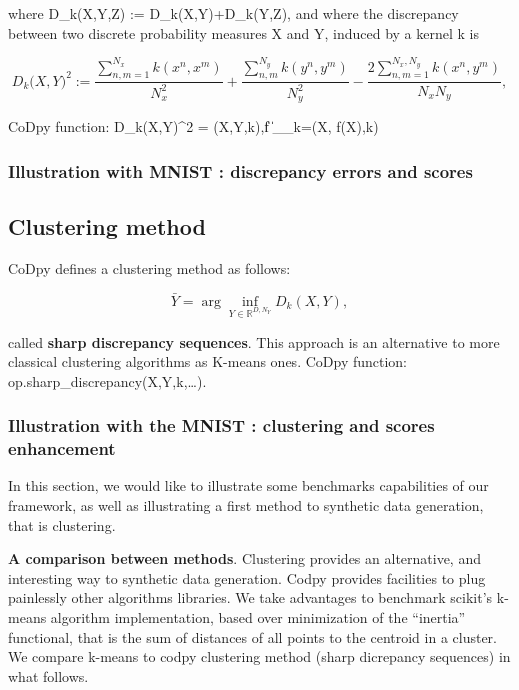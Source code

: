 \documentclass[]{article}
\def\({}%
\def\){}%
\numberwithin{equation}{section}
\newcommand \RR    {\mathbb{R}}
\begin{document}
where \(D_k(X,Y,Z) := D_k(X,Y)+D_k(Y,Z)\), and where the discrepancy
between two discrete probability measures \(X\) and \(Y\), induced by a
kernel \(k\) is

\begin{equation}\label{Dk}
    D_k\big(X,Y\big)^2 := \frac{ \sum_{n,m=1}^{N_x}  k(x^n,x^m)}{N_x^2} + \frac{\sum_{n,m}^{N_y} k(y^n,y^m)}{N_y^2} - \frac{2 \sum_{n,m=1}^{N_x,N_y} k(x^n,y^m)}{N_x N_y}, 
\end{equation}

CoDpy function:
\(D_k\big(X,Y\big)^2 = (X,Y,k),\| f \|_{_k}=(X, f(X),k)\)

\subsubsection{Illustration with MNIST : discrepancy errors and
scores}\label{illustration-with-mnist-discrepancy-errors-and-scores}

\subsection{Clustering method}\label{clustering-method}

CoDpy defines a clustering method as follows:

\begin{equation} \label{cluster}
 \bar{Y} = \arg \inf_{Y \in \RR^{D,N_Y}} D_k(X,Y),
\end{equation}

called \textbf{sharp discrepancy sequences}. This approach is an
alternative to more classical clustering algorithms as K-means ones.
CoDpy function: op.sharp\_discrepancy(X,Y,k,\ldots{}).

\subsubsection{Illustration with the MNIST : clustering and scores
enhancement}\label{illustration-with-the-mnist-clustering-and-scores-enhancement}

In this section, we would like to illustrate some benchmarks
capabilities of our framework, as well as illustrating a first method to
synthetic data generation, that is clustering.

\textbf{A comparison between methods}. Clustering provides an
alternative, and interesting way to synthetic data generation. Codpy
provides facilities to plug painlessly other algorithms libraries. We
take advantages to benchmark scikit's k-means algorithm implementation,
based over minimization of the ``inertia'' functional, that is the sum
of distances of all points to the centroid in a cluster. We compare
k-means to codpy clustering method (sharp dicrepancy sequences) in what
follows.
\end{document}
